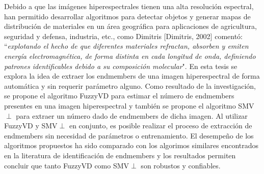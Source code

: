 \documentclass[11pt, oneside]{Thesis} %
\begin{document}
Debido a que las im\'agenes hiperespectrales tienen una alta resoluci\'on espectral, han permitido 
desarrollar algoritmos para detectar objetos y generar mapas de distribución de materiales en 
un \'area geogr\'afica para aplicaciones de agricultura, seguridad y defensa, industria, 
etc., como Dimitris [Dimitris, 2002] coment\'o: ``\emph{explotando 
el hecho de que diferentes materiales refractan, absorben y emiten energ\'ia electromagn\'etica, 
de forma distinta en cada longitud de onda, definiendo patrones identificables debido a su 
composici\'on molecular}". En esta tesis se explora la idea de extraer los 
endmembers de una imagen hiperespectral de forma autom\'atica y sin requerir par\'ametro alguno. 
Como resultado de la investigaci\'on, se propone el algoritmo FuzzyVD para estimar el número de 
endmembers presentes en una imagen hiperespectral y tambi\'en se propone el algoritmo 
SMV$\perp$ para extraer un n\'umero dado de endmembers de dicha imagen. Al utilizar FuzzyVD y 
SMV$\perp$ en conjunto, es posible realizar el proceso de extracci\'on de endmembers sin necesidad 
de par\'ametros o entrenamiento. El desempe\~no de los algoritmos propuestos ha sido comparado 
con los algorimos similares encontrados en la literatura de identificaci\'on de endmembers 
y los resultados permiten concluir que tanto FuzzyVD como SMV$\perp$ son robustos 
y confiables.









\clearpage %

\end{document}
